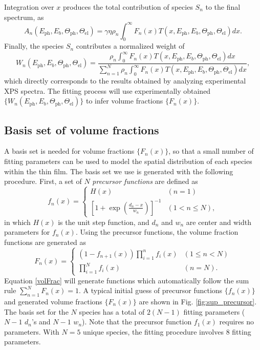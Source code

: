 \documentclass{WileyMSP-template}
\begin{document}
Integration over $x$ produces the total contribution of species $S_n$ to the final spectrum, as
\begin{equation}
A_n(E_\textrm{ph}, E_b, \Theta_\textrm{ph},\Theta_\textrm{el}) =  \gamma\eta\rho_n\int_0^\infty F_n(x)T(x, E_\textrm{ph}, E_b, \Theta_\textrm{ph},\Theta_\textrm{el})dx.
\label{pe_collect_2}
\end{equation}
Finally, the species $S_n$ contributes a normalized weight of
\begin{equation}
W_n(E_\textrm{ph}, E_b, \Theta_\textrm{ph},\Theta_\textrm{el}) =  \frac{\rho_n\displaystyle\int_0^\infty F_n(x)T(x, E_\textrm{ph}, E_b, \Theta_\textrm{ph},\Theta_\textrm{el})dx}{\displaystyle\sum_{n=1}^{N}\rho_n\displaystyle\int_0^\infty F_n(x)T(x, E_\textrm{ph}, E_b, \Theta_\textrm{ph},\Theta_\textrm{el})dx},
\label{XPS_spectral_weight}
\end{equation}
which directly corresponds to the results obtained by analyzing experimental XPS spectra. The fitting process will use experimentally obtained $\{W_n(E_\textrm{ph}, E_b, \Theta_\textrm{ph},\Theta_\textrm{el})\}$ to infer volume fractions $\{F_n(x)\}$.

\subsection{Basis set of volume fractions}
\label{Basis set of volume fractions}
A basis set is needed for volume fractions $\{F_n(x)\}$, so that a small number of fitting parameters can be used to model the spatial distribution of each species within the thin film. The basis set we use is generated with the following procedure. First, a set of $N$ \emph{precursor functions} are defined as 
\begin{equation}
f_n(x) =
\begin{cases}
H(x) & (n=1)\\
\left[1 + \exp\left(\frac{d_n - x}{w_n}\right)\right]^{-1} &  (1<n\leq N),
\end{cases}
\label{precursors}
\end{equation}
in which $H(x)$ is the unit step function, and $d_n$ and $w_n$ are center and width parameters for $f_n(x)$. Using the precursor functions, the volume fraction functions are generated as
\begin{equation}
F_n(x) =
\begin{cases}
\left(1-f_{n+1}(x)\right)\displaystyle\prod_{i=1}^n f_i(x)& (1\leq n<N)\\
\displaystyle\prod_{i=1}^N f_i(x) &  (n = N).
\end{cases}
\label{volFrac}
\end{equation}
Equation \ref{volFrac} will generate functions which automatically follow the sum rule $\sum\limits_{n=1}^N F_n(x) = 1$. A typical initial guess of precursor functions $\{f_n(x)\}$ and generated volume fractions $\{F_n(x)\}$ are shown in Fig. \ref{fig:sup_precursor}. The basis set for the $N$ species has a total of $2(N-1)$ fitting parameters ($N-1$ $d_n$'s and $N-1$ $w_n$). Note that the precursor function $f_1(x)$ requires no parameters. With $N=5$ unique species, the fitting procedure involves 8 fitting parameters.
\end{document}
